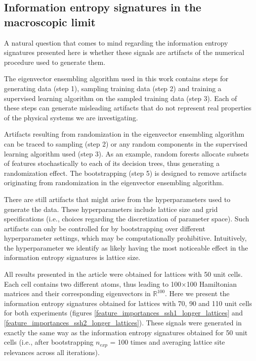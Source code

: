 \documentclass[10pt]{revtex4-1}
\begin{document}
\subsection*{Information entropy signatures in the macroscopic limit}

A natural question that comes to mind regarding the information entropy signatures presented here is whether these signals are artifacts of the numerical procedure used to generate them.

The eigenvector ensembling algorithm used in this work contains steps for generating data (step 1), sampling training data (step 2) and training a supervised learning algorithm on the sampled training data (step 3). Each of these steps can generate misleading artifacts that do not represent real properties of the physical systems we are investigating.

Artifacts resulting from randomization in the eigenvector ensembling algorithm can be traced to sampling (step 2) or any random components in the supervised learning algorithm used (step 3). As an example, random forests allocate subsets of features stochastically to each of its decision trees, thus generating a randomization effect. The bootstrapping (step 5) is designed to remove artifacts originating from randomization in the eigenvector ensembling algorithm.

There are still artifacts that might arise from the hyperparameters used to generate the data. These hyperparameters include lattice size and grid specifications (i.e., choices regarding the discretization of parameter space). Such artifacts can only be controlled for by bootstrapping over different hyperparameter settings, which may be computationally prohibitive. Intuitively, the hyperparameter we identify as likely having the most noticeable effect in the information entropy signatures is lattice size.

All results presented in the article were obtained for lattices with 50 unit cells. Each cell contains two different atoms, thus leading to 100$\times$100 Hamiltonian matrices and their corresponding eigenvectors in $\mathbb{R}^{100}$. Here we present the information entropy signatures obtained for lattices with 70, 90 and 110 unit cells for both experiments (figures \ref{feature_importances_ssh1_longer_lattices} and \ref{feature_importances_ssh2_longer_lattices}). These signals were generated in exactly the same way as the information entropy signatures obtained for 50 unit cells (i.e., after bootstrapping $n_{exp}$ = 100 times and averaging lattice site relevances across all iterations).
\end{document}
